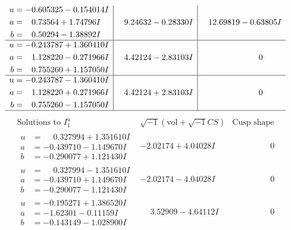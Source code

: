 \documentclass[1p]{elsarticle_modified}
\theoremstyle{definition}
\newcommand{\I}{\sqrt{-1}}
\begin{document}
$$\begin{array}{c|c|c}
\begin{aligned}
u &= -0.605325 - 0.154014 I \\
a &= \phantom{-}0.73564 + 1.74796 I \\
b &= \phantom{-}0.50294 - 1.38892 I\end{aligned}
 & \phantom{-}9.24632 - 0.28330 I & \phantom{-}12.69819 - 0.63805 I \\ \hline\begin{aligned}
u &= -0.243787 + 1.360410 I \\
a &= \phantom{-}1.128220 - 0.271966 I \\
b &= \phantom{-}0.755260 + 1.157050 I\end{aligned}
 & \phantom{-}4.42124 - 2.83103 I & \phantom{-0.000000 } 0 \\ \hline\begin{aligned}
u &= -0.243787 - 1.360410 I \\
a &= \phantom{-}1.128220 + 0.271966 I \\
b &= \phantom{-}0.755260 - 1.157050 I\end{aligned}
 & \phantom{-}4.42124 + 2.83103 I & \phantom{-0.000000 } 0\\
 \hline 
 \end{array}$$\newpage$$\begin{array}{c|c|c}  
\text{Solutions to }I^u_{1}& \I (\text{vol} + \sqrt{-1}CS) & \text{Cusp shape}\\
 \hline 
\begin{aligned}
u &= \phantom{-}0.327994 + 1.351610 I \\
a &= -0.439710 - 1.149670 I \\
b &= -0.290077 + 1.121430 I\end{aligned}
 & -2.02174 + 4.04028 I & \phantom{-0.000000 } 0 \\ \hline\begin{aligned}
u &= \phantom{-}0.327994 - 1.351610 I \\
a &= -0.439710 + 1.149670 I \\
b &= -0.290077 - 1.121430 I\end{aligned}
 & -2.02174 - 4.04028 I & \phantom{-0.000000 } 0 \\ \hline\begin{aligned}
u &= -0.195271 + 1.386520 I \\
a &= -1.62301 - 0.11159 I \\
b &= -0.143149 - 1.028900 I\end{aligned}
 & \phantom{-}3.52909 - 4.64112 I & \phantom{-0.000000 } 0 \\ \hline\begin{aligned}

\end{aligned}
\end{array}$$
\end{document}
